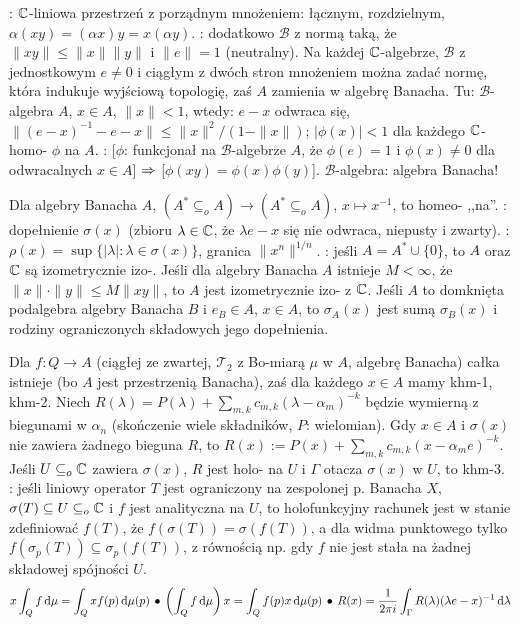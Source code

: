 :  $\mathbb{C}$-liniowa przestrzeń z porządnym mnożeniem: łącznym, rozdzielnym, $\alpha(xy)= (\alpha x)y = x(\alpha y)$.
: dodatkowo $\mathscr B$ z normą taką, że $\|xy\| \le \|x\|\|y\|$ i $\|e\| = 1$ (neutralny).
Na każdej $\mathbb{C}$-algebrze, $\mathscr B$ z jednostkowym $e \neq 0$ i ciągłym z dwóch stron mnożeniem można zadać normę, która indukuje wyjściową topologię, zaś $A$ zamienia w algebrę Banacha.
Tu:  $\mathscr B$-algebra $A$, $x\in  A$, $\|x\| <1$, wtedy: $e-x$ odwraca się, $\|(e-x)^{-1} - e-x\|\le \|x\|^2 / (1-\|x\|)$; $|\phi(x)| < 1$ dla każdego $\mathbb{C}$-homo- $\phi$ na $A$.
: [$\phi$:  funkcjonał na $\mathscr B$-algebrze $A$, że $\phi(e) = 1$ i $\phi(x) \neq 0$ dla odwracalnych $x \in A$] $\Rightarrow$ [$\phi(xy) = \phi(x)\phi(y)$].
\hfill $\mathscr B$-algebra: algebra Banacha!

Dla  algebry Banacha $A$, $(A^* \subseteq_o A) \to (A^* \subseteq_o A)$, $x \mapsto x^{-1}$, to homeo- ,,na''.
: dopełnienie  $\sigma(x)$ (zbioru $\lambda \in \mathbb{C}$, że $\lambda e-x$ się nie odwraca, niepusty i zwarty).
: $\rho(x) = \sup\{ |\lambda| : \lambda \in \sigma(x)\}$, granica $\|x^n\|^{1/n}$.
: jeśli $A = A^* \cup \{0\}$, to $A$ oraz $\mathbb{C}$ są izometrycznie izo-.
Jeśli dla algebry Banacha $A$ istnieje $M < \infty$, że $\|x \| \cdot \|y\| \le M\|xy\|$, to $A$ jest izometrycznie izo- z $\mathbb{C}$.
Jeśli $A$ to domknięta podalgebra algebry Banacha $B$ i $e_B \in A$, $x \in A$, to $\sigma_A(x)$ jest sumą $\sigma_B(x)$ i rodziny ograniczonych składowych jego dopełnienia.

Dla  $f \colon Q \to A$ (ciągłej ze zwartej, $\mathcal T_2$ z Bo-miarą $\mu$ w $A$, algebrę Banacha) całka istnieje (bo $A$ jest przestrzenią Banacha), zaś dla każdego $x \in A$ mamy khm-1, khm-2.
Niech $R(\lambda) = P(\lambda) + \sum_{m,k} c_{m,k} (\lambda - \alpha_m)^{-k}$ będzie wymierną z biegunami w $\alpha_n$ (skończenie wiele składników, $P$: wielomian).
Gdy $x \in A$ i $\sigma(x)$ nie zawiera żadnego bieguna $R$, to $R(x) := P(x) + \sum_{m,k} c_{m,k} (x - \alpha_m e)^{-k}$.
Jeśli $U \subseteq_o \mathbb{C}$ zawiera $\sigma(x)$, $R$ jest holo- na $U$ i $\Gamma$ otacza $\sigma(x)$ w $U$, to khm-3.
: jeśli liniowy operator $T$ jest ograniczony na zespolonej p. Banacha $X$, $\sigma(T) \subseteq U \subseteq_o \mathbb{C}$ i $f$ jest analityczna na $U$, to holofunkcyjny rachunek jest w stanie zdefiniować $f(T)$, że $f(\sigma(T)) = \sigma(f(T))$, a dla widma punktowego tylko $f(\sigma_p(T)) \subseteq \sigma_p(f(T))$, z równością np. gdy $f$ nie jest stała na żadnej składowej spójności $U$.  %
\[
	x \int_Q f \,\textrm{d} \mu = \int_Q x f(p) \,\textrm{d} \mu(p) \, \bullet \,
	\left(\int_Q f \,\textrm{d} \mu \right) x = \int_Q f(p)x \,\textrm{d} \mu(p) \, \bullet \,
	R(x) = \frac{1}{2\pi i} \int_\Gamma R(\lambda) (\lambda e - x)^{-1} \,\textrm{d}\lambda
\]

